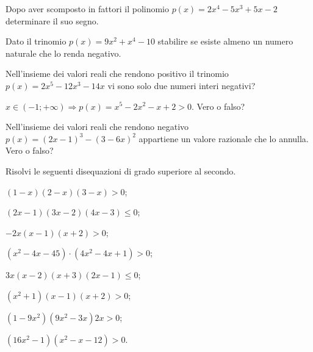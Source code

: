 \begin{esercizio}
 \label{ese:4.28}
Dopo aver scomposto in fattori il polinomio $p(x)=2x^4-5x^3+5x-2$ determinare il suo segno.
\end{esercizio}

\begin{esercizio}
 \label{ese:4.29}
Dato il trinomio $p(x)=9x^2+x^4-10$ stabilire se esiste almeno un numero naturale che lo renda negativo.
\end{esercizio}

\begin{esercizio}
\label{ese:4.30}
Nell'insieme dei valori reali che rendono positivo il trinomio $p(x)=2x^5-12x^3-14x$ vi sono solo due numeri interi negativi?
\end{esercizio}

\begin{esercizio}
 \label{ese:4.31}
$x\in (-1;+\infty )\Rightarrow p(x)=x^5-2x^2-x+2>0$. Vero o falso?
\end{esercizio}

\begin{esercizio}
\label{ese:4.32}
Nell'insieme dei valori reali che rendono negativo $p(x)=(2x-1)^3-(3-6x)^2$ appartiene un valore razionale che lo annulla. Vero o falso?
\end{esercizio}
\pagebreak
\begin{esercizio}[\Ast]
\label{ese:4.33}
Risolvi le seguenti disequazioni di grado superiore al secondo.
\begin{multicols}{2}
\begin{enumeratea}
\item $(1-x)(2-x)(3-x)>0$;
\item $(2x-1)(3x-2)(4x-3)\le 0$;
\item $-2x(x-1)(x+2)>0$;
\item $ \left(x^2-4x-45\right)\cdot \left(4x^2-4x+1\right)>0 $;
\item $3x(x-2)(x+3)(2x-1)\le 0$;
\item $\left(x^2+1\right)(x-1)(x+2)>0$;
\item $\left(1-9x^2\right)\left(9x^2-3x\right)2x>0$;
\item $\left(16x^2-1\right)\left(x^2-x-12\right)>0$.
\end{enumeratea}
\end{multicols}
\end{esercizio}


